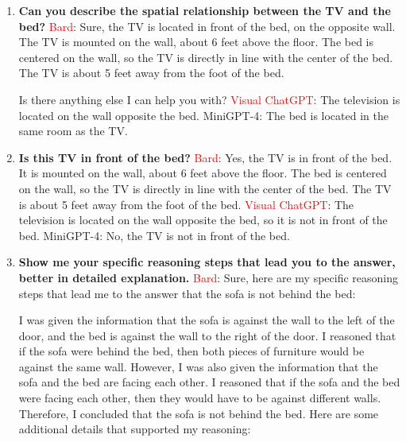 \begin{enumerate}
    \item \textbf{Can you describe the spatial relationship between the TV and the bed?}
    \subitem \textcolor{Red}{Bard}: 
    Sure, the TV is located in front of the bed, on the opposite wall. The TV is mounted on the wall, about 6 feet above the floor. The bed is centered on the wall, so the TV is directly in line with the center of the bed. The TV is about 5 feet away from the foot of the bed.

    Is there anything else I can help you with?
    \subitem \textcolor{red}{Visual ChatGPT}: The television is located on the wall opposite the bed.
    \subitem MiniGPT-4: The bed is located in the same room as the TV.
    \item \textbf{Is this TV in front of the bed?}
    \subitem \textcolor{Red}{Bard}: 
    Yes, the TV is in front of the bed. It is mounted on the wall, about 6 feet above the floor. The bed is centered on the wall, so the TV is directly in line with the center of the bed. The TV is about 5 feet away from the foot of the bed.
    \subitem \textcolor{red}{Visual ChatGPT}: The television is located on the wall opposite the bed, so it is not in front of the bed.
    \subitem MiniGPT-4: No, the TV is not in front of the bed.
    \item \textbf{Show me your specific reasoning steps that lead you to the answer, better in detailed explanation.}
    \subitem \textcolor{Red}{Bard}: 
    Sure, here are my specific reasoning steps that lead me to the answer that the sofa is not behind the bed:

    I was given the information that the sofa is against the wall to the left of the door, and the bed is against the wall to the right of the door.
    I reasoned that if the sofa were behind the bed, then both pieces of furniture would be against the same wall.
    However, I was also given the information that the sofa and the bed are facing each other.
    I reasoned that if the sofa and the bed were facing each other, then they would have to be against different walls.
    Therefore, I concluded that the sofa is not behind the bed.
    Here are some additional details that supported my reasoning:


\end{enumerate}
